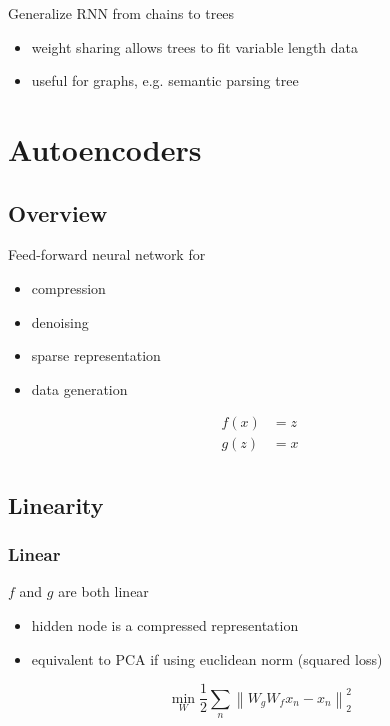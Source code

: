 \documentclass[]{article}
\theoremstyle{definition}
\newcommand\norm[1]{\left\lVert#1\right\rVert}
\begin{document}
Generalize RNN from chains to trees
\begin{itemize}
    \item weight sharing allows trees to fit variable length data
    \item useful for graphs, e.g. semantic parsing tree
\end{itemize}


\section{Autoencoders}
\label{sec:autoencoders}


\subsection{Overview}
Feed-forward neural network for 
\begin{itemize}
    \item compression
    \item denoising
    \item sparse representation
    \item data generation
\end{itemize}

\begin{align*}
    f(x) &= z \\
    g(z) &= x \\
\end{align*}


\subsection{Linearity}
\label{sub:linearity}

\subsubsection{Linear}
\label{ssub:linear_autoencoder}

$f$ and $g$ are both linear
\begin{itemize}
    \item hidden node is a compressed representation
    \item equivalent to PCA if using euclidean norm (squared loss)
\end{itemize}

\begin{equation*}
    \min_W \frac{1}{2} \sum_n \norm{W_g W_f x_n - x_n}^2_2
\end{equation*}
\end{document}
